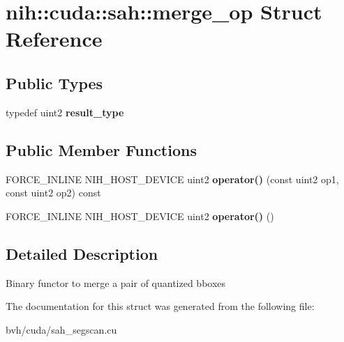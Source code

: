 \hypertarget{structnih_1_1cuda_1_1sah_1_1merge__op}{
\section{nih\-:\-:cuda\-:\-:sah\-:\-:merge\-\_\-op \-Struct \-Reference}
\label{structnih_1_1cuda_1_1sah_1_1merge__op}
}
\subsection*{\-Public \-Types}
\begin{DoxyCompactItemize}
\item 
\hypertarget{structnih_1_1cuda_1_1sah_1_1merge__op_a56bb29119386fa2eb934bc962500a7b7}{
typedef uint2 {\bfseries result\-\_\-type}}
\label{structnih_1_1cuda_1_1sah_1_1merge__op_a56bb29119386fa2eb934bc962500a7b7}

\end{DoxyCompactItemize}
\subsection*{\-Public \-Member \-Functions}
\begin{DoxyCompactItemize}
\item 
\hypertarget{structnih_1_1cuda_1_1sah_1_1merge__op_a0b5f526ed3c99859308a0b74b38f84de}{
\-F\-O\-R\-C\-E\-\_\-\-I\-N\-L\-I\-N\-E \-N\-I\-H\-\_\-\-H\-O\-S\-T\-\_\-\-D\-E\-V\-I\-C\-E uint2 {\bfseries operator()} (const uint2 op1, const uint2 op2) const }
\label{structnih_1_1cuda_1_1sah_1_1merge__op_a0b5f526ed3c99859308a0b74b38f84de}

\item 
\hypertarget{structnih_1_1cuda_1_1sah_1_1merge__op_ae8edcf8580a40503ab9a80cb92084e02}{
\-F\-O\-R\-C\-E\-\_\-\-I\-N\-L\-I\-N\-E \-N\-I\-H\-\_\-\-H\-O\-S\-T\-\_\-\-D\-E\-V\-I\-C\-E uint2 {\bfseries operator()} ()}
\label{structnih_1_1cuda_1_1sah_1_1merge__op_ae8edcf8580a40503ab9a80cb92084e02}

\end{DoxyCompactItemize}


\subsection{\-Detailed \-Description}
\-Binary functor to merge a pair of quantized bboxes 

\-The documentation for this struct was generated from the following file\-:\begin{DoxyCompactItemize}
\item 
bvh/cuda/sah\-\_\-segscan.\-cu\end{DoxyCompactItemize}
